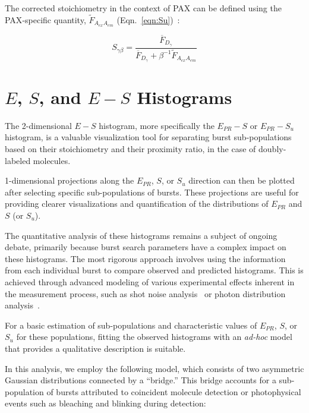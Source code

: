 The corrected stoichiometry in the context of \ac{PAX} can be defined using the \ac{PAX}-specific quantity, $\tilde{F}_{A_{ex}A_{em}}$ (Eqn.~\ref{eqn:Su})~\cite{ingargiola_JCP_2018}:

\begin{equation}
    \label{eqn:corr_Spax}
    S_{\gamma\beta} = \frac{\overline{F}_{D_{\gamma}}}{\overline{F}_{D_{\gamma}} + \beta^{-1}\tilde{F}_{A_{ex}A_{em}}}
\end{equation}


\section{$E$, $S$, and $E-S$ Histograms}
\label{sec:E_S_histogram}

The 2-dimensional $E - S$ histogram, more specifically the $E_{PR}-S$ or $E_{PR}-S_u$ histogram, is a valuable visualization tool for separating burst sub-populations based on their stoichiometry and their proximity ratio, in the case of doubly-labeled molecules. 

1-dimensional projections along the $E_{PR}$, $S$, or $S_u$ direction can then be plotted after selecting specific sub-populations of bursts. 
These projections are useful for providing clearer visualizations and quantification of the distributions of $E_{PR}$ and $S$ (or $S_u$).

The quantitative analysis of these histograms remains a subject of ongoing debate, primarily because burst search parameters have a complex impact on these histograms. 
The most rigorous approach involves using the information from each individual burst to compare observed and predicted histograms. 
This is achieved through advanced modeling of various experimental effects inherent in the measurement process, such as shot noise analysis~\cite{nir_JPCB_2006,ingargiola_PLOS1_2016} or photon distribution analysis~\cite{antonik_JPCB_2006}.

For a basic estimation of sub-populations and characteristic values of $E_{PR}$, $S$, or $S_u$ for these populations, fitting the observed histograms with an \textit{ad-hoc} model that provides a qualitative description is suitable.

In this analysis, we employ the following model, which consists of two asymmetric Gaussian distributions connected by a \enquote{bridge.} 
This bridge accounts for a sub-population of bursts attributed to coincident molecule detection or photophysical events such as bleaching and blinking during detection:

